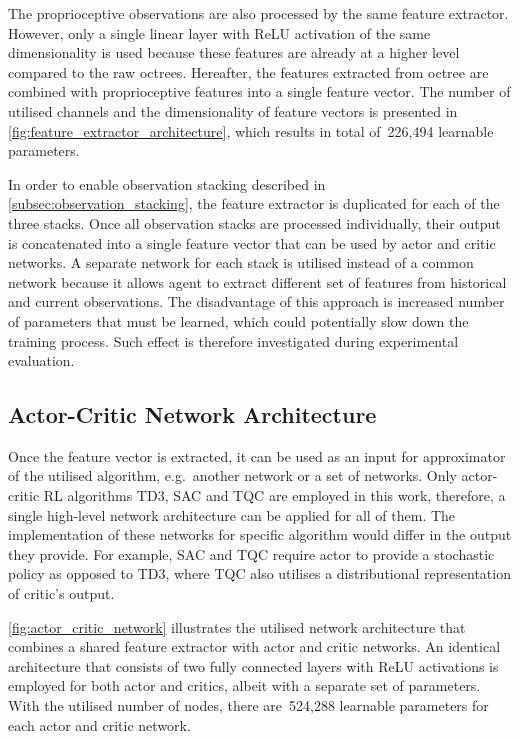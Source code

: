 The proprioceptive observations are also processed by the same feature extractor. However, only a single linear layer with ReLU activation of the same dimensionality is used because these features are already at a higher level compared to the raw octrees. Hereafter, the features extracted from octree are combined with proprioceptive features into a single feature vector. The number of utilised channels and the dimensionality of feature vectors is presented in \autoref{fig:feature_extractor_architecture}, which results in total of~226,494 learnable parameters.

In order to enable observation stacking described in \autoref{subsec:observation_stacking}, the feature extractor is duplicated for each of the three stacks. Once all observation stacks are processed individually, their output is concatenated into a single feature vector that can be used by actor and critic networks. A separate network for each stack is utilised instead of a common network because it allows agent to extract different set of features from historical and current observations. The disadvantage of this approach is increased number of parameters that must be learned, which could potentially slow down the training process. Such effect is therefore investigated during experimental evaluation.


\subsection{Actor-Critic Network Architecture}\label{subsec:actor_critic_network_architecture}

Once the feature vector is extracted, it can be used as an input for approximator of the utilised algorithm, e.g.~another network or a set of networks. Only actor-critic RL algorithms TD3, SAC and TQC are employed in this work, therefore, a single high-level network architecture can be applied for all of them. The implementation of these networks for specific algorithm would differ in the output they provide. For example, SAC and TQC require actor to provide a stochastic policy as opposed to TD3, where TQC also utilises a distributional representation of critic's output.

\autoref{fig:actor_critic_network} illustrates the utilised network architecture that combines a shared feature extractor with actor and critic networks. An identical architecture that consists of two fully connected layers with ReLU activations is employed for both actor and critics, albeit with a separate set of parameters. With the utilised number of nodes, there are~524,288 learnable parameters for each actor and critic network.

